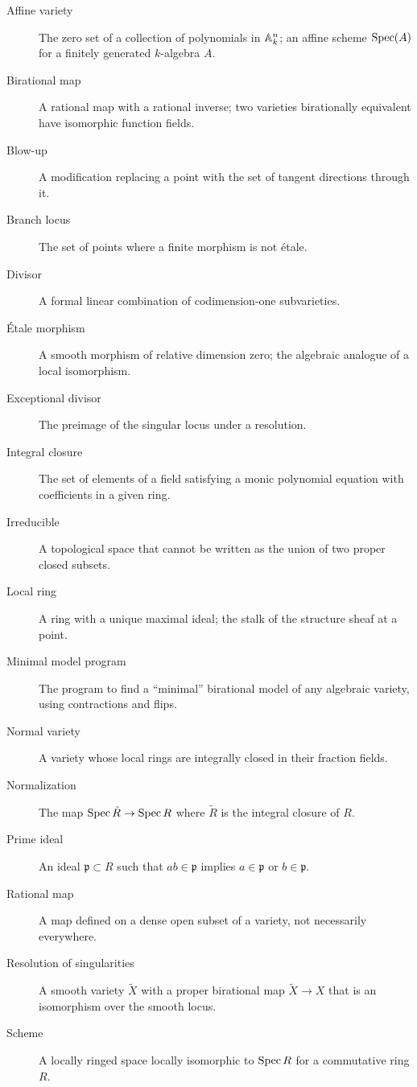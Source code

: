 \begin{description}
    \item[Affine variety] The zero set of a collection of polynomials in $\mathbb{A}^n_k$; an affine scheme $\operatorname{Spec}(A)$ for a finitely generated $k$-algebra $A$.
    \item[Birational map] A rational map with a rational inverse; two varieties birationally equivalent have isomorphic function fields.
    \item[Blow-up] A modification replacing a point with the set of tangent directions through it.
    \item[Branch locus] The set of points where a finite morphism is not \'{e}tale.
    \item[Divisor] A formal linear combination of codimension-one subvarieties.
    \item[\'{E}tale morphism] A smooth morphism of relative dimension zero; the algebraic analogue of a local isomorphism.
    \item[Exceptional divisor] The preimage of the singular locus under a resolution.
    \item[Integral closure] The set of elements of a field satisfying a monic polynomial equation with coefficients in a given ring.
    \item[Irreducible] A topological space that cannot be written as the union of two proper closed subsets.
    \item[Local ring] A ring with a unique maximal ideal; the stalk of the structure sheaf at a point.
    \item[Minimal model program] The program to find a ``minimal'' birational model of any algebraic variety, using contractions and flips.
    \item[Normal variety] A variety whose local rings are integrally closed in their fraction fields.
    \item[Normalization] The map $\operatorname{Spec} \tilde R \to \operatorname{Spec} R$ where $\tilde R$ is the integral closure of $R$.
    \item[Prime ideal] An ideal $\mathfrak{p} \subset R$ such that $ab \in \mathfrak{p}$ implies $a \in \mathfrak{p}$ or $b \in \mathfrak{p}$.
    \item[Rational map] A map defined on a dense open subset of a variety, not necessarily everywhere.
    \item[Resolution of singularities] A smooth variety $\tilde X$ with a proper birational map $\tilde X \to X$ that is an isomorphism over the smooth locus.
    \item[Scheme] A locally ringed space locally isomorphic to $\operatorname{Spec} R$ for a commutative ring $R$.

\end{description}

